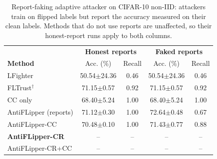 \begin{table}[t]
\centering
\caption{Report-faking adaptive attacker on CIFAR-10 non-IID: attackers train on flipped labels but report the accuracy measured on their clean labels. Methods that do not use reports are unaffected, so their honest-report runs apply to both columns.}
\label{tab:adaptive}
\renewcommand{\arraystretch}{1.1}
\footnotesize
\setlength{\tabcolsep}{4pt}
\begin{tabular}{l|cc|cc}
\hline
& \multicolumn{2}{c|}{\textbf{Honest reports}} & \multicolumn{2}{c}{\textbf{Faked reports}} \\
\textbf{Method} & Acc. (\%) & Recall & Acc. (\%) & Recall \\
\hline
LFighter & 50.54$\pm$24.36 & 0.46 & 50.54$\pm$24.36 & 0.46 \\
FLTrust$^\dagger$ & 71.15$\pm$0.57 & 0.92 & 71.15$\pm$0.57 & 0.92 \\
CC only & 68.40$\pm$5.24 & 1.00 & 68.40$\pm$5.24 & 1.00 \\
AntiFLipper (reports) & 71.12$\pm$0.30 & 1.00 & 72.64$\pm$0.48 & 0.67 \\
AntiFLipper-CC & 70.48$\pm$0.10 & 1.00 & 71.43$\pm$0.77 & 0.88 \\
\textbf{AntiFLipper-CR} & -- & -- & -- & -- \\
AntiFLipper-CR+CC & -- & -- & -- & -- \\
\hline
\end{tabular}
\end{table}
